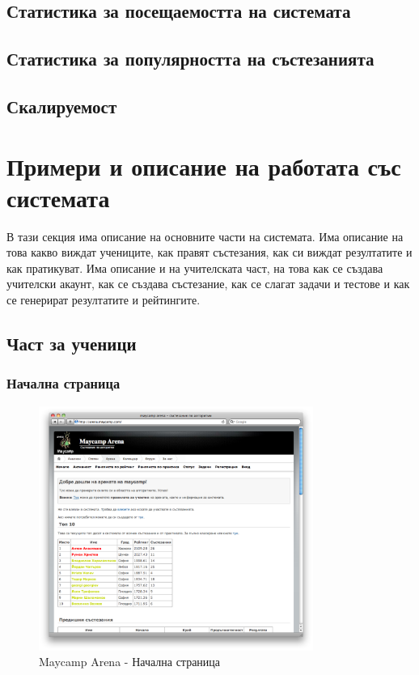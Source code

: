 \documentclass[a4paper,12pt]{article}
\begin{document}
  \subsection{Статистика за посещаемостта на системата}
  \subsection{Статистика за популярността на състезанията}
  \subsection{Скалируемост}
  \section{Примери и описание на работата със системата}
  В тази секция има описание на основните части на системата. Има описание на това какво виждат учениците, как правят състезания, как си виждат резултатите и как пратикуват. Има описание и на учителската част, на това как се създава учителски акаунт, как се създава състезание, как се слагат задачи и тестове и как се генерират резултатите и рейтингите.
  \subsection{Част за ученици}
  \subsubsection{Начална страница}
  \begin{figure}[ht]
    \begin{center}
      \includegraphics[width=0.8\textwidth]{images/maycamp_arena_home.png}
    \end{center}
    \caption{Maycamp Arena - Начална страница}
    \label{arena_homepage}
  \end{figure}
\end{document}

